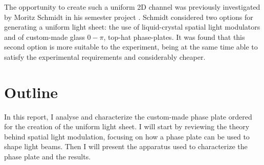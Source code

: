 The opportunity to create such a uniform 2D channel was previously investigated by Moritz Schmidt in his semester project \cite{schmidt2021}. Schmidt considered two options for generating a uniform light sheet: the use of liquid-crystal spatial light modulators and of custom-made glass $0-\pi$, top-hat phase-plates. It was found that this second option is more suitable to the experiment, being at the same time  able to satisfy the experimental requirements and considerably cheaper.

\section{Outline}
In this report, I analyse and characterize the custom-made phase plate ordered for the creation of the uniform light sheet. I will start by reviewing the theory behind spatial light modulation, focusing on how a phase plate can be used to shape light beams. Then I will present the apparatus used to characterize the phase plate and the results.